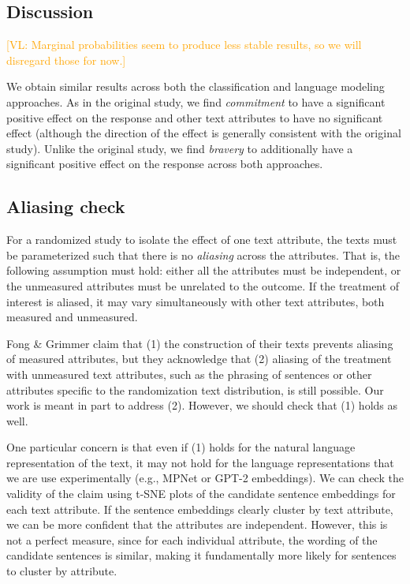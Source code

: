 \documentclass{article}
\newcommand{\vl}[1]{\textcolor{orange}{[VL: #1]}}
\begin{document}
\subsection{Discussion}

\vl{Marginal probabilities seem to produce less stable results, so we will disregard those for now.}

We obtain similar results across both the classification and language modeling approaches.  As in the original study, we find \textit{commitment} to have a significant positive effect on the response and other text attributes to have no significant effect (although the direction of the effect is generally consistent with the original study). Unlike the original study, we find \textit{bravery} to additionally have a significant positive effect on the response across both approaches.

\subsection{Aliasing check}

For a randomized study to isolate the effect of one text attribute, the texts must be parameterized such that there is no \textit{aliasing} across the attributes. That is, the following assumption must hold: either all the attributes must be independent, or the unmeasured attributes must be unrelated to the outcome. If the treatment of interest is aliased, it may vary simultaneously with other text attributes, both measured and unmeasured.

Fong \& Grimmer claim that (1) the construction of their texts prevents aliasing of measured attributes, but they acknowledge that (2) aliasing of the treatment with unmeasured text attributes, such as the phrasing of sentences or other attributes specific to the randomization text distribution, is still possible. Our work is meant in part to address (2). However, we should check that (1) holds as well. 

One particular concern is that even if (1) holds for the natural language representation of the text, it may not hold for the language representations that we are use experimentally (e.g., MPNet or GPT-2 embeddings). We can check the validity of the claim using t-SNE plots of the candidate sentence embeddings for each text attribute. If the sentence embeddings clearly cluster by text attribute, we can be more confident that the attributes are independent. However, this is not a perfect measure, since for each individual attribute, the wording of the candidate sentences is similar, making it fundamentally more likely for sentences to cluster by attribute.
\end{document}
